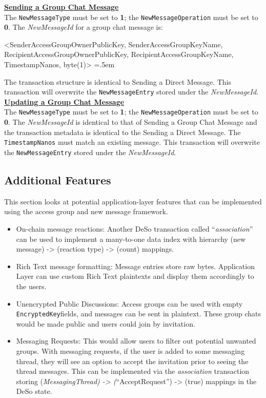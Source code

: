 \documentclass[oneside, 12pt]{article}
\newenvironment{lcverbatim}
 {\SaveVerbatim{cverb}}
 {\endSaveVerbatim
  \flushleft\fboxrule=0pt\fboxsep=.5em
  \colorbox{cverbbg}{%
    \makebox[\dimexpr\linewidth-2\fboxsep][l]{\BUseVerbatim{cverb}}%
  }
  \endflushleft
}
\begin{document}
\noindent\underline{\textbf{Sending a Group Chat Message}}\\
The \texttt{NewMessageType} must be set to \textbf{1}; the \texttt{NewMessageOperation} must be set to \textbf{0}.
The \textit{NewMessageId} for a group chat message is:

\begin{scriptsize}
\begin{lcverbatim}
<SenderAccessGroupOwnerPublicKey, SenderAccessGroupKeyName, RecipientAccessGroupOwnerPublicKey,
RecipientAccessGroupKeyName, TimestampNanos, byte(1)>
\end{lcverbatim}
\end{scriptsize}

\noindent The transaction structure is identical to Sending a Direct Message. This transaction will overwrite the \texttt{NewMessageEntry} stored under the \textit{NewMessageId}.\\

\noindent\underline{\textbf{Updating a Group Chat Message}}\\
The \texttt{NewMessageType} must be set to \textbf{1}; the \texttt{NewMessageOperation} must be set to \textbf{0}.
The \textit{NewMessageId} is identical to that of Sending a Group Chat Message and the transaction metadata is identical to the Sending a Direct Message. The \texttt{TimestampNanos} must match an existing message. This transaction will overwrite the \texttt{NewMessageEntry} stored under the \textit{NewMessageId}.

\subsection{Additional Features}
This section looks at potential application-layer features that can be implemented using the access group and new message framework.

\begin{itemize}
  \item On-chain message reactions: Another DeSo transaction called “\textit{association}” can be used to implement a many-to-one data index with hierarchy (new message) -> (reaction type) -> (count) mappings.
  \item Rich Text message formatting: Message entries store raw bytes. Application Layer can use custom Rich Text plaintexts and display them accordingly to the users.
  \item Unencrypted Public Discussions: Access groups can be used with empty \texttt{EncryptedKey}fields, and messages can be sent in plaintext. These group chats would be made public and users could join by invitation.
  \item Messaging Requests: This would allow users to filter out potential unwanted groups. With messaging requests, if the user is added to some messaging thread, they will see an option to accept the invitation prior to seeing the thread messages. This can be implemented via the \textit{association} transaction storing (\textit{MessagingThread) -> (}“AcceptRequest”) -> (true) mappings in the DeSo state.
\end{itemize}
\end{document}
